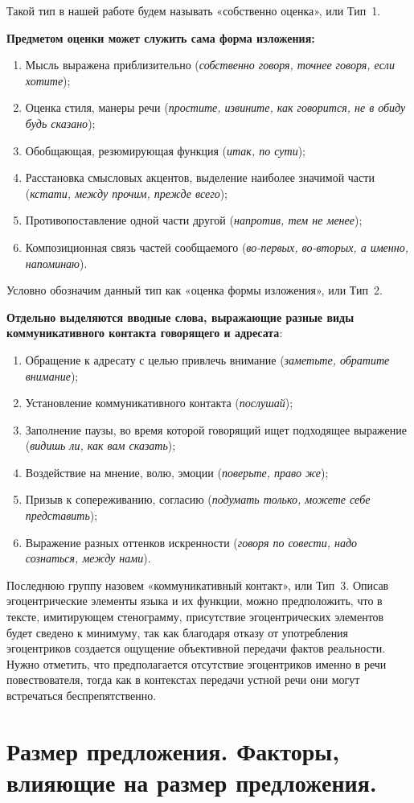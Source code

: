 \documentclass{kursa4}
\begin{document}
{      Такой тип в нашей работе будем называть «собственно оценка», или Тип~1. 

      \textbf{Предметом оценки может служить сама форма изложения:}
      \begin{enumerate}
        \item Мысль выражена приблизительно (\textit{собственно говоря, точнее говоря, если хотите}); \item Оценка стиля, манеры речи (\textit{простите, извините, как говорится, не в обиду будь сказано}); \item Обобщающая, резюмирующая функция (\textit{итак, по сути}); \item Расстановка смысловых акцентов, выделение наиболее значимой части (\textit{кстати, между прочим, прежде всего}); \item Противопоставление одной части другой (\textit{напротив, тем не менее}); \item Композиционная связь частей сообщаемого (\textit{во-первых, во-вторых, а именно, напоминаю}). \end{enumerate}

      Условно обозначим данный тип как «оценка формы изложения», или Тип~2. 

      \textbf{Отдельно выделяются вводные слова, выражающие разные виды коммуникативного контакта говорящего и адресата}: \begin{enumerate}
        \item Обращение к адресату с целью привлечь внимание (\textit{заметьте, обратите внимание}); \item Установление коммуникативного контакта (\textit{послушай}); \item Заполнение паузы, во время которой говорящий ищет подходящее выражение (\textit{видишь ли, как вам сказать}); \item Воздействие на мнение, волю, эмоции (\textit{поверьте, право же}); \item Призыв к сопереживанию, согласию (\textit{подумать только, можете себе представить}); \item Выражение разных оттенков искренности (\textit{говоря по совести, надо сознаться, между нами}). \end{enumerate}
      Последнюю группу назовем «коммуникативный контакт», или Тип~3. Описав эгоцентрические элементы языка и их функции, можно предположить, что в тексте, имитирующем стенограмму, присутствие эгоцентрических элементов будет сведено к минимуму, так как благодаря отказу от употребления эгоцентриков создается ощущение объективной передачи фактов реальности. Нужно отметить, что предполагается отсутствие эгоцентриков именно в речи повествователя, тогда как в контекстах передачи устной речи они могут встречаться беспрепятственно. \section{Размер предложения. Факторы, влияющие на размер предложения.}

}
\end{document}

